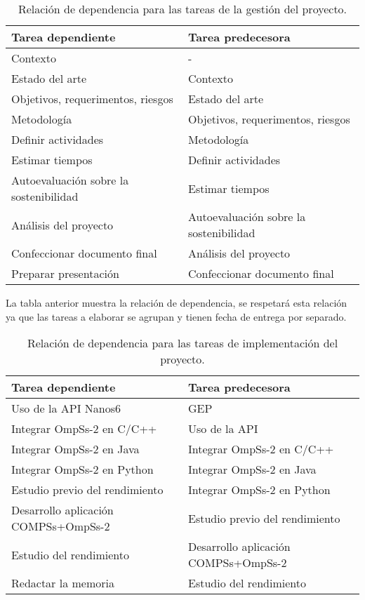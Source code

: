 \begin{table}[H]
\centering
 \begin{tabular}{|| l | l ||}
    \hline  
    Tarea dependiente & Tarea predecesora \\
    \hline\hline
    Contexto & - \\
    \hline
    Estado del arte & Contexto \\
    \hline
    Objetivos, requerimentos, riesgos & Estado del arte \\
    \hline
    Metodología & Objetivos, requerimentos, riesgos \\
    \hline
    Definir actividades & Metodología \\
    \hline
    Estimar tiempos & Definir actividades \\
    \hline
    Autoevaluación sobre la sostenibilidad & Estimar tiempos \\
    \hline
    Análisis del proyecto & Autoevaluación sobre la sostenibilidad \\
    \hline
    Confeccionar documento final & Análisis del proyecto \\
    \hline
    Preparar presentación & Confeccionar documento final \\
    \hline
 \end{tabular}
 \caption{Relación de dependencia para las tareas de la gestión del proyecto.}
 \label{table:1}
\end{table}

La tabla anterior muestra la relación de dependencia, se respetará esta relación ya que las tareas a elaborar se agrupan y tienen fecha de entrega por separado. 

\begin{table}[H]
 \centering
 \begin{tabular}{|| l | l ||}
    \hline  
    Tarea dependiente & Tarea predecesora \\
    \hline\hline
    Uso de la API Nanos6 & GEP \\
    \hline
    Integrar OmpSs-2 en C/C++ & Uso de la API \\
    \hline
    Integrar OmpSs-2 en Java & Integrar OmpSs-2 en C/C++ \\
    \hline
    Integrar OmpSs-2 en Python & Integrar OmpSs-2 en Java \\
    \hline
    Estudio previo del rendimiento & Integrar OmpSs-2 en Python \\
    \hline
    Desarrollo aplicación COMPSs+OmpSs-2 & Estudio previo del rendimiento \\
    \hline
    Estudio del rendimiento & Desarrollo aplicación COMPSs+OmpSs-2 \\
    \hline
    Redactar la memoria & Estudio del rendimiento \\
    \hline
 \end{tabular}
    \caption{Relación de dependencia para las tareas de implementación del proyecto.}
    \label{table:2}
\end{table}

